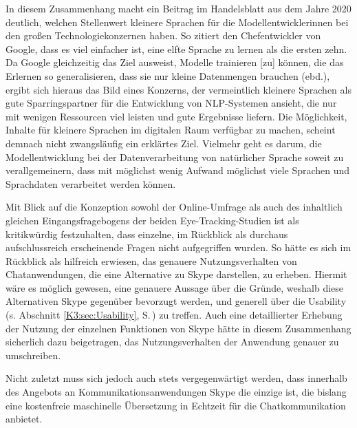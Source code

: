 In diesem Zusammenhang macht ein Beitrag im Handelsblatt aus dem Jahre 2020 deutlich, welchen Stellenwert kleinere Sprachen für die Modellentwickler{\textperiodcentered}innen bei den großen Technologiekonzernen haben. So zitiert \citet[]{holzki_digitale_2020} den Chefentwickler von Google, \glqq dass es viel einfacher ist, eine elfte Sprache zu lernen als die ersten zehn\grqq{}. Da Google gleichzeitig das Ziel ausweist, \glqq Modelle trainieren [zu] können, die das Erlernen so generalisieren, dass sie nur kleine Datenmengen brauchen\grqq{} (ebd.), ergibt sich hieraus das Bild eines Konzerns, der vermeintlich kleinere Sprachen als gute Sparringspartner für die Entwicklung von NLP-Systemen ansieht, die nur mit wenigen Ressourcen viel leisten und gute Ergebnisse liefern. Die Möglichkeit, Inhalte für kleinere Sprachen im digitalen Raum verfügbar zu machen, scheint demnach nicht zwangsläufig ein erklärtes Ziel. Vielmehr geht es darum, die Modellentwicklung bei der Datenverarbeitung von natürlicher Sprache soweit zu verallgemeinern, dass mit möglichst wenig Aufwand möglichst viele Sprachen und Sprachdaten verarbeitet werden können. 

Mit Blick auf die Konzeption sowohl der Online-Umfrage als auch des inhaltlich gleichen Eingangsfragebogens der beiden Eye-Tracking-Studien ist als kritikwürdig festzuhalten, dass einzelne, im Rückblick als durchaus aufschlussreich erscheinende Fragen nicht aufgegriffen wurden. So hätte es sich im Rückblick als hilfreich erwiesen, das genauere Nutzungsverhalten von Chatanwendungen, die eine Alternative zu Skype darstellen, zu erheben. Hiermit wäre es möglich gewesen, eine genauere Aussage über die Gründe, weshalb diese Alternativen Skype gegenüber bevorzugt werden, und generell über die Usability (s. Abschnitt \ref{K3:sec:Usability}, S.\,\pageref{K3:sec:Usability}) zu treffen. Auch eine detaillierter Erhebung der Nutzung der einzelnen Funktionen von Skype hätte in diesem Zusammenhang sicherlich dazu beigetragen, das Nutzungsverhalten der Anwendung genauer zu umschreiben.

Nicht zuletzt muss sich jedoch auch stets vergegenwärtigt werden, dass innerhalb des Angebots an Kommunikationsanwendungen Skype die einzige ist, die bislang eine kostenfreie maschinelle Übersetzung in Echtzeit für die Chatkommunikation anbietet.


